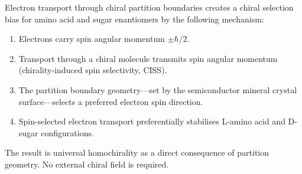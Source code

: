 \begin{theorem}
\label{thm:chirality_selection}
Electron transport through chiral partition boundaries creates a chiral selection
bias for amino acid and sugar enantiomers by the following mechanism:
\begin{enumerate}[label=(\roman*)]
  \item Electrons carry spin angular momentum $\pm\hbar/2$.
  \item Transport through a chiral molecule transmits spin angular momentum
        (chirality-induced spin selectivity, CISS).
  \item The partition boundary geometry---set by the semiconductor mineral crystal
        surface---selects a preferred electron spin direction.
  \item Spin-selected electron transport preferentially stabilises L-amino acid
        and D-sugar configurations.
\end{enumerate}
The result is universal homochirality as a direct consequence of partition geometry.
No external chiral field is required.
\end{theorem}

